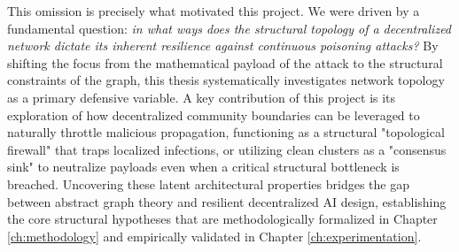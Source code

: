 This omission is precisely what motivated this project. We were driven by a fundamental question: \textit{in what ways does the structural topology of a decentralized network dictate its inherent resilience against continuous poisoning attacks?} By shifting the focus from the mathematical payload of the attack to the structural constraints of the graph, this thesis systematically investigates network topology as a primary defensive variable. A key contribution of this project is its exploration of how decentralized community boundaries can be leveraged to naturally throttle malicious propagation, functioning as a structural "topological firewall" that traps localized infections, or utilizing clean clusters as a "consensus sink" to neutralize payloads even when a critical structural bottleneck is breached. Uncovering these latent architectural properties bridges the gap between abstract graph theory and resilient decentralized AI design, establishing the core structural hypotheses that are methodologically formalized in Chapter \ref{ch:methodology} and empirically validated in Chapter \ref{ch:experimentation}.